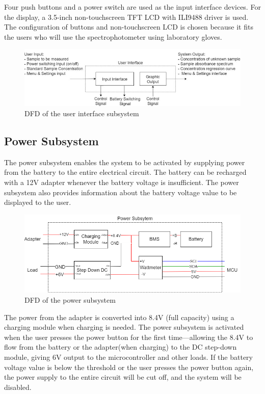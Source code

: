\documentclass[conference]{IEEEtran}
\begin{document}
Four push buttons and a power switch are used as the input interface devices.
For the display, a 3.5-inch non-touchscreen TFT LCD with ILI9488 driver is used.
The configuration of buttons and non-touchscreen LCD is chosen because it fits the users who will use the spectrophotometer using laboratory gloves.

    \begin{figure}[htbp]
    \centerline{\includegraphics[scale=0.43]{ui-dfd.png}}
    \caption{DFD of the user interface subsystem}
    \label{ui-dfd}
    \end{figure}


\subsection{Power Subsystem}
The power subsystem enables the system to be activated by supplying power from the battery to the entire electrical circuit. 
The battery can be recharged with a 12V adapter whenever the battery voltage is insufficient. 
The power subsystem also provides information about the battery voltage value to be displayed to the user. 

\begin{figure}[htbp]
    \centerline{\includegraphics[scale=0.3]{power-schematic.png}}
    \caption{DFD of the power subsystem}
    \label{power-dfd}
    \end{figure}

The power from the adapter is converted into 8.4V (full capacity) using a charging module when charging is needed.
The power subsystem is activated when the user presses the power button for the first time—allowing the 8.4V to flow from the battery or the adapter(when charging) to the DC step-down module, giving 6V output to the microcontroller and other loads. 
If the battery voltage value is below the threshold or the user presses the power button again, the power supply to the entire circuit will be cut off, and the system will be disabled.
\end{document}
